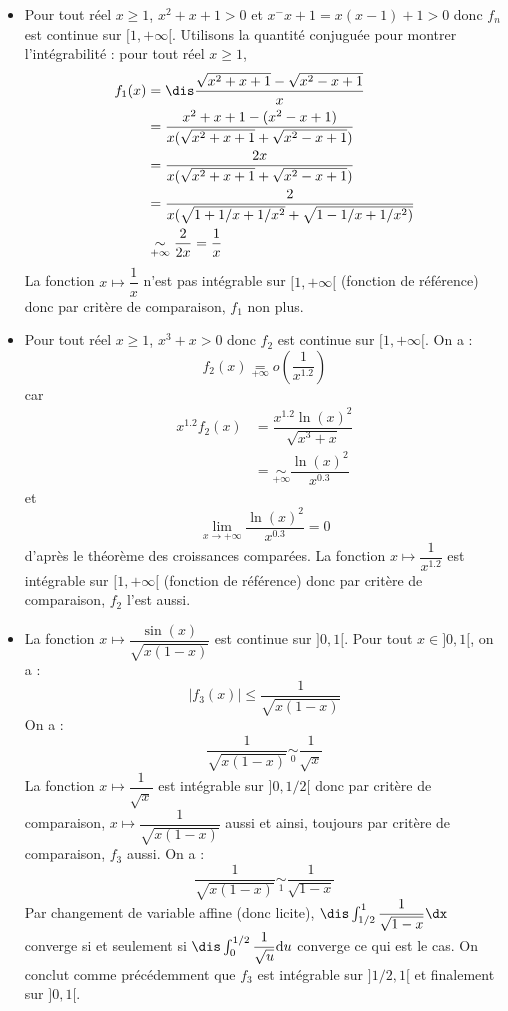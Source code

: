 \documentclass[a4paper,10pt]{report}
\begin{document}
\corr 

\begin{itemize}
\item Pour tout réel $x \geq 1$, $x^2+x+1 > 0$ et $x^-x+1=x(x-1)+1 >0$ donc $f_n$ est continue sur $[1, + \infty[$. Utilisons la quantité conjuguée pour montrer l'intégrabilité : pour tout réel $x \geq 1$,
\begin{align*}
f_1(x) & =\dis\frac{\sqrt{x^2+x+1}-\sqrt{x^2-x+1}}{x} \\
& = \dfrac{x^2+x+1-(x^2-x+1)}{x(\sqrt{x^2+x+1}+\sqrt{x^2-x+1})} \\
& = \dfrac{2x}{x(\sqrt{x^2+x+1}+\sqrt{x^2-x+1})} \\
& = \dfrac{2}{x(\sqrt{1+1/x+1/x^2}+ \sqrt{1-1/x+1/x^2)}} \\
& \underset{+ \infty}{\sim} \dfrac{2}{2x} = \dfrac{1}{x}
\end{align*}
La fonction $x \mapsto \dfrac{1}{x}$ n'est pas intégrable sur $[1, + \infty[$ (fonction de référence) donc par critère de comparaison, $f_1$ non plus.
\item Pour tout réel $x \geq 1$, $x^3+x>0$ donc $f_2$ est continue sur $[1, + \infty[$. On a :
$$ f_2(x) \underset{+\infty}{=} o \left( \dfrac{1}{x^{1.2}} \right)$$
car 
\begin{align*}
x^{1.2} f_2(x) & = \dfrac{x^{1.2} \ln(x)^2}{\sqrt{x^3+x}} \\
& = \underset{+ \infty}{\sim} \dfrac{\ln(x)^2}{x^{0.3}} 
\end{align*}
et 
$$ \lim_{x \rightarrow + \infty} \dfrac{\ln(x)^2}{x^{0.3}}  = 0$$
d'après le théorème des croissances comparées. La fonction $x \mapsto \dfrac{1}{x^{1.2}}$ est intégrable sur $[1, + \infty[$ (fonction de référence) donc par critère de comparaison, $f_2$ l'est aussi.
\item La fonction $x \mapsto \dfrac{\sin(x)}{\sqrt{x(1-x)}}$ est continue sur $]0,1[$. Pour tout $x \in ]0,1[$, on a :
$$ \vert f_3(x) \vert \leq \dfrac{1}{\sqrt{x(1-x)}}$$
On a :
$$ \dfrac{1}{\sqrt{x(1-x)}} \underset{0}{\sim} \dfrac{1}{\sqrt{x}}$$
La fonction $x \mapsto\dfrac{1}{\sqrt{x}}$ est intégrable sur $]0,1/2[$ donc par critère de comparaison, $x \mapsto \dfrac{1}{\sqrt{x(1-x)}}$ aussi et ainsi, toujours par critère de comparaison, $f_3$ aussi. On a :
$$  \dfrac{1}{\sqrt{x(1-x)}} \underset{1}{\sim} \dfrac{1}{\sqrt{1-x}}$$
Par changement de variable affine (donc licite), $\dis \int_{1/2}^1 \dfrac{1}{\sqrt{1-x}} \dx$ converge si et seulement si $\dis \int_{0}^{1/2} \dfrac{1}{\sqrt{u}} \textrm{d}u$ converge ce qui est le cas. On conclut comme précédemment que $f_3$ est intégrable sur $]1/2,1[$ et finalement sur $]0,1[$.

\end{itemize}
\end{document}
